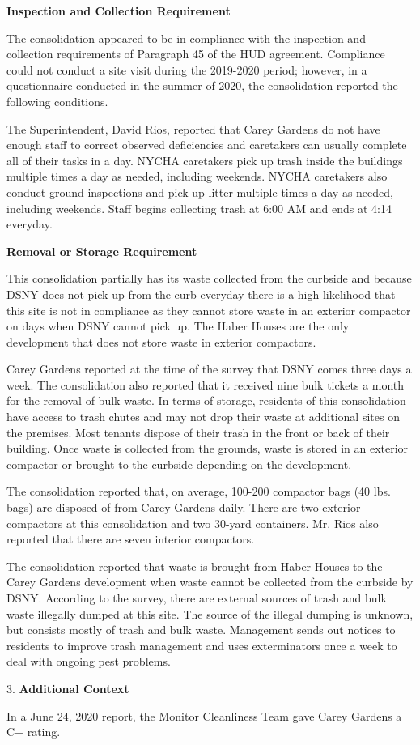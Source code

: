 
\textbf{Inspection and Collection Requirement}

The consolidation appeared to be in compliance with the inspection and collection requirements of Paragraph 45 of the HUD agreement. Compliance could not conduct a site visit during the 2019-2020 period; however, in a questionnaire conducted in the summer of 2020, the consolidation reported the following conditions.

The Superintendent, David Rios, reported that Carey Gardens do not have enough staff to correct observed deficiencies and caretakers can usually complete all of their tasks in a day. NYCHA caretakers pick up trash inside the buildings multiple times a day as needed, including weekends. NYCHA caretakers also conduct ground inspections and pick up litter multiple times a day as needed, including weekends. Staff begins collecting trash at 6:00 AM and ends at 4:14 everyday.

\textbf{Removal or Storage Requirement}

This consolidation partially has its waste collected from the curbside and because DSNY does not pick up from the curb everyday there is a high likelihood that this site is not in compliance as they cannot store waste in an exterior compactor on days when DSNY cannot pick up. The Haber Houses are the only development that does not store waste in exterior compactors.

Carey Gardens reported at the time of the survey that DSNY comes three days a week. The consolidation also reported that it received nine bulk tickets a month for the removal of bulk waste. In terms of storage, residents of this consolidation have access to trash chutes and may not drop their waste at additional sites on the premises. Most tenants dispose of their trash in the front or back of their building. Once waste is collected from the grounds, waste is stored in an exterior compactor or brought to the curbside depending on the development.

The consolidation reported that, on average, 100-200 compactor bags (40 lbs. bags)  are disposed of from Carey Gardens daily. There are two exterior compactors at this consolidation and two 30-yard containers. Mr. Rios also reported that there are seven interior compactors.

The consolidation reported that waste is brought from Haber Houses to the Carey Gardens development when waste cannot be collected from the curbside by DSNY. According to the survey, there are external sources of trash and bulk waste illegally dumped at this site. The source of the illegal dumping is unknown, but consists mostly of trash and bulk waste. Management sends out notices to residents to improve trash management and uses exterminators once a week to deal with ongoing pest problems.

3. \textbf{Additional Context} 

In a June 24, 2020 report, the Monitor Cleanliness Team gave Carey Gardens a C+ rating. 